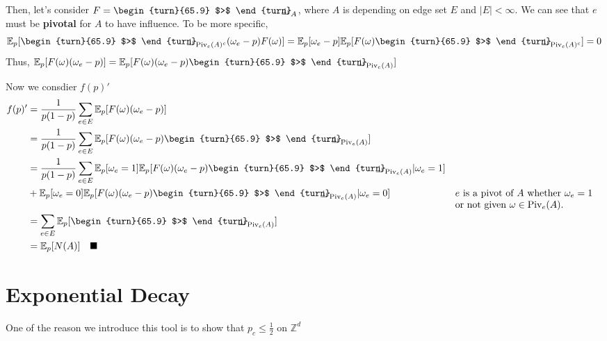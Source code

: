 \documentclass[12pt,a4paper]{report}
\theoremstyle{definition}
\newcommand{\indecate}{\mbox{\begin{turn}{65.9}
$>$
\end{turn}\hspace{-10.5pt}\parbox[t][-5pt][c]{10pt}{$\bot$}\hspace{-4.35pt}\parbox[t][-3.4pt][c]{4pt}{$\shortmid$}}}
\begin{document}
\begin{enumerate}
		Then, let's consider $F = \indecate_A$, where $A$ is depending on edge set $E$ and $|E| < \infty$. We can see that $e$ must be \textbf{pivotal} for $A$ to have influence. 
		To be more specific, 
		$$
		\mathbb{E}_p[\indecate_{\text{Piv}_e(A)^c}(\omega_e - p)F(\omega)] = \mathbb{E}_p[\omega_e - p] \mathbb{E}_p[F(\omega)\indecate_{\text{Piv}_e(A)^c}] =  0
		$$
		Thus, $\mathbb{E}_p[F(\omega)(\omega_e - p)] = \mathbb{E}_p[F(\omega)(\omega_e - p) \indecate_{\text{Piv}_e(A)}]$	
		
		Now we consdier $f(p)'$
		\begin{equation*}
			\begin{aligned}
				f(p)' &= \frac{1}{p(1-p)}\sum_{e \in E} \mathbb{E}_p[F(\omega)(\omega_e - p)] 
				   \\ &= \frac{1}{p(1-p)}\sum_{e \in E} \mathbb{E}_p[F(\omega)(\omega_e - p) \indecate_{\text{Piv}_e(A)}]	
				   \\ &= \frac{1}{p(1-p)}\sum_{e \in E} \mathbb{E}_p[\omega_e = 1]\mathbb{E}_p[F(\omega)(\omega_e - p) \indecate_{\text{Piv}_e(A)}|\omega_e = 1] 
				   \\ &+ \mathbb{E}_p[\omega_e = 0]\mathbb{E}_p[F(\omega)(\omega_e - p) \indecate_{\text{Piv}_e(A)} | \omega_e = 0]	&& \parbox[t]{5cm}{$e$ is a pivot of $A$ whether $\omega_e = 1$ or not given $\omega \in \text{Piv}_e(A)$.}	 
				   \\ &= \sum_{e \in E} \mathbb{E}_p[\indecate_{\text{Piv}_e(A)}]	
				   \\ &= \mathbb{E}_p[N(A)]\quad \blacksquare 
			\end{aligned}
		\end{equation*}
\end{enumerate}


\chapter{Exponential Decay}
One of the reason we introduce this tool is to show that $p_c \leq \frac{1}{2}$ on $\mathbb{Z}^d$ 
\end{document}
